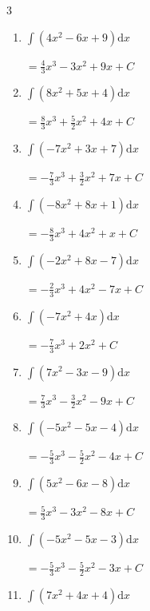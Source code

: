 \begin{multicols}{3}
\begin{enumerate}
  \item $\displaystyle \int \left( 4x^{2}-6x+9 \right) \mathrm{d}x$

        $\displaystyle =\frac{4}{3}x^{3}-3x^{2}+9x+ C$

  \item $\displaystyle \int \left( 8x^{2}+5x+4 \right) \mathrm{d}x$

        $\displaystyle =\frac{8}{3}x^{3}+\frac{5}{2}x^{2}+4x+ C$

  \item $\displaystyle \int \left( -7x^{2}+3x+7 \right) \mathrm{d}x$

        $\displaystyle =-\frac{7}{3}x^{3}+\frac{3}{2}x^{2}+7x+ C$

  \item $\displaystyle \int \left( -8x^{2}+8x+1 \right) \mathrm{d}x$

        $\displaystyle =-\frac{8}{3}x^{3}+4x^{2}+x+ C$

  \item $\displaystyle \int \left( -2x^{2}+8x-7 \right) \mathrm{d}x$

        $\displaystyle =-\frac{2}{3}x^{3}+4x^{2}-7x+ C$

  \item $\displaystyle \int \left( -7x^{2}+4x \right) \mathrm{d}x$

        $\displaystyle =-\frac{7}{3}x^{3}+2x^{2}+ C$

  \item $\displaystyle \int \left( 7x^{2}-3x-9 \right) \mathrm{d}x$

        $\displaystyle =\frac{7}{3}x^{3}-\frac{3}{2}x^{2}-9x+ C$

  \item $\displaystyle \int \left( -5x^{2}-5x-4 \right) \mathrm{d}x$

        $\displaystyle =-\frac{5}{3}x^{3}-\frac{5}{2}x^{2}-4x+ C$

  \item $\displaystyle \int \left( 5x^{2}-6x-8 \right) \mathrm{d}x$

        $\displaystyle =\frac{5}{3}x^{3}-3x^{2}-8x+ C$

  \item $\displaystyle \int \left( -5x^{2}-5x-3 \right) \mathrm{d}x$

        $\displaystyle =-\frac{5}{3}x^{3}-\frac{5}{2}x^{2}-3x+ C$

\columnbreak %

  \item $\displaystyle \int \left( 7x^{2}+4x+4 \right) \mathrm{d}x$


\end{enumerate}
\end{multicols}
